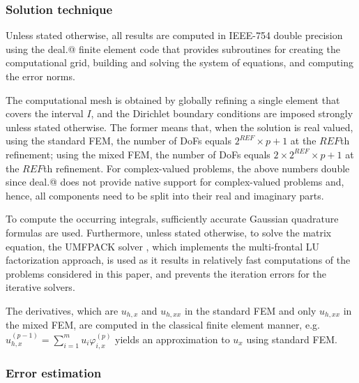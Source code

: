 \documentclass[review,3p]{elsarticle}
\makeatletter
\newcommand*{\rom}[1]{\expandafter\@slowromancap\romannumeral #1@}
\makeatother
\begin{document}
\subsubsection{Solution technique}

Unless stated otherwise, all results are computed in IEEE-754 double precision \cite{zuras2008ieee} using the deal.\rom{2} finite element code \cite{alzetta2018deal} that provides subroutines for creating the computational grid, building and solving the system of equations, and computing the error norms.

The computational mesh is obtained by globally refining a single element that covers the interval $I$, and the Dirichlet boundary conditions are imposed strongly unless stated otherwise.
The former means that, when the solution is real valued, using the standard FEM, the number of DoFs equals $2^{REF} \times p+1$ at the $REF$th refinement;
using the mixed FEM, the number of DoFs equals $2 \times 2^{REF} \times p+1$ at the $REF$th refinement.
For complex-valued problems, the above numbers double since deal.\rom{2} does not provide native support for complex-valued problems and, hence, all components need to be split into their real and imaginary parts.

To compute the occurring integrals, sufficiently accurate Gaussian quadrature formulas are used. 
Furthermore, unless stated otherwise, to solve the matrix equation, the UMFPACK solver \cite{davis2004algorithm}, which implements the multi-frontal LU factorization approach, is used as it results in relatively fast computations of the problems considered in this paper, and prevents the iteration errors for the iterative solvers. 

The derivatives, which are $u_{h,x}$ and $u_{h,xx}$ in the standard FEM and only $u_{h,xx}$ in the mixed FEM, are computed in the classical finite element manner, e.g. $u_{h,x} ^{(p-1)}=\sum\limits _{i=1}^m u_i\varphi_{i,x}^{(p)}$ yields an approximation to $u_x$ using standard FEM. 

\subsubsection{Error estimation}
\end{document}
